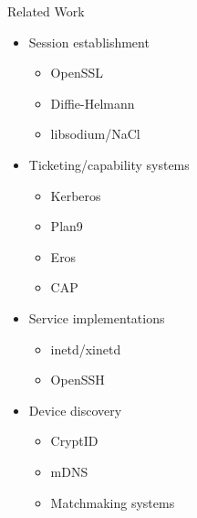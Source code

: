 \documentclass[a4paper]{beamer}
\begin{document}
\begin{frame}{Related Work}
    \begin{itemize}
        \item Session establishment
            \begin{itemize}
                \item OpenSSL
                \item Diffie-Helmann
                \item libsodium/NaCl
            \end{itemize}
        \item Ticketing/capability systems
            \begin{itemize}
                \item Kerberos
                \item Plan9
                \item Eros
                \item CAP
            \end{itemize}
        \item Service implementations
            \begin{itemize}
                \item inetd/xinetd
                \item OpenSSH
            \end{itemize}
        \item Device discovery
            \begin{itemize}
                \item CryptID
                \item mDNS
                \item Matchmaking systems
            \end{itemize}
    \end{itemize}
\end{frame}
\end{document}
